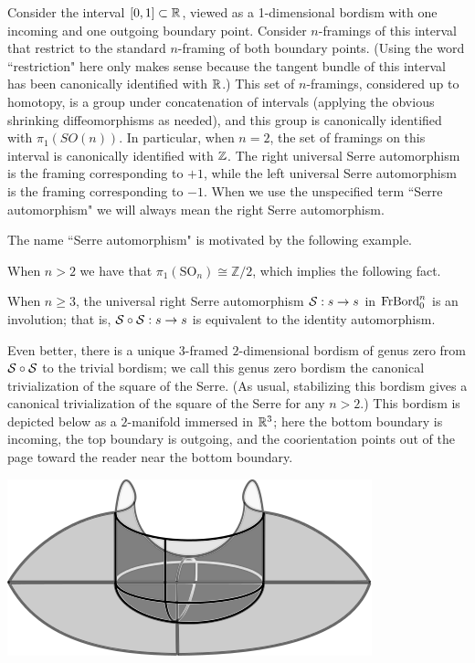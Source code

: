 \documentclass{amsart}
\begin{document}
\begin{remark}
Consider the interval $[0,1] \subset \mathbb R$, viewed as a 1-dimensional bordism with one incoming and one outgoing boundary point.  Consider $n$-framings of this interval that restrict to the standard $n$-framing of both boundary points.  (Using the word ``restriction" here only makes sense because the tangent bundle of this interval has been canonically identified with $\mathbb R$.)  This set of $n$-framings, considered up to homotopy, is a group under concatenation of intervals (applying the obvious shrinking diffeomorphisms as needed), and this group is canonically identified with $\pi_1(SO(n))$.  In particular, when $n=2$, the set of framings on this interval is canonically identified with $\mathbb Z$.  The right universal Serre automorphism is the framing corresponding to $+1$, while the left universal Serre automorphism is the framing corresponding to $-1$.  When we use the unspecified term ``Serre automorphism" we will always mean the right Serre automorphism.
\end{remark}

The name ``Serre automorphism" is motivated by the following example.

\begin{example}
\end{example}

When $n>2$ we have that $\pi_1(\mathrm{SO}_n) \cong \mathbb{Z}/2$, which implies the following fact.

\begin{proposition}
When $n \geq 3$, the universal right Serre automorphism $\mathcal S: s \rightarrow s$ in $\mathrm{FrBord}_0^n$ is an involution; that is, $\mathcal S \circ \mathcal S : s \rightarrow s$ is equivalent to the identity automorphism. 
\end{proposition}

Even better, there is a unique $3$-framed $2$-dimensional bordism of genus zero from $\mathcal S \circ \mathcal S$ to the trivial bordism; we call this genus zero bordism the canonical trivialization of the square of the Serre.  (As usual, stabilizing this bordism gives a canonical trivialization of the square of the Serre for any $n > 2$.)  This bordism is depicted below as a $2$-manifold immersed in $\mathbb R^3$; here the bottom boundary is incoming, the top boundary is outgoing, and the coorientation points out of the page toward the reader near the bottom boundary.

\begin{center}
\includegraphics{cobordism.png}
\end{center}
\end{document}
